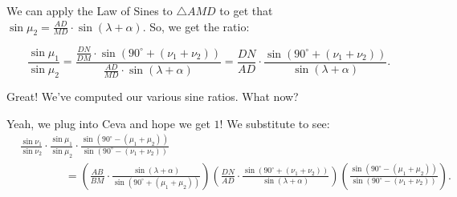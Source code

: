 






We can apply the Law of Sines to $\triangle AMD$ to get that $\sin \mu_2 = \frac{AD}{MD} \cdot \sin{(\lambda + \alpha)}.$ So, we get the ratio:

$$\frac{\sin \mu_1}{\sin \mu_2} = \frac{\frac{DN}{DM}\cdot \sin{(90^{\circ}+(\nu_1 + \nu_2))}}{\frac{AD}{MD}\cdot \sin{(\lambda + \alpha)}} = \frac{DN}{AD} \cdot \frac{\sin{(90^{\circ}+(\nu_1 + \nu_2))}}{\sin{(\lambda+\alpha)}}.$$

Great! We've computed our various sine ratios. What now?





Yeah, we plug into Ceva and hope we get $1!$ We substitute to see:
\begin{align*}
&\frac{\sin{\nu_1}}{\sin{\nu_2}} \cdot \frac{\sin{ \mu_1}}{\sin{\mu_2}} \cdot \frac{\sin{(90^{\circ}-(\mu_1+\mu_2))}}{\sin{(90^{\circ}-(\nu_1+\nu_2))}} \\
&\qquad\qquad= \left( \frac{AB}{BM} \cdot \frac{\sin{(\lambda+\alpha)}}{\sin{(90^{\circ}+(\mu_1+\mu_2))}} \right) \left( \frac{DN}{AD} \cdot \frac{\sin{(90^{\circ}+(\nu_1+\nu_2))}}{\sin{(\lambda+\alpha)}} \right) \left( \frac{\sin{(90^{\circ}-(\mu_1+\mu_2))}}{\sin{(90^{\circ}-(\nu_1+\nu_2))}} \right).
\end{align*}

